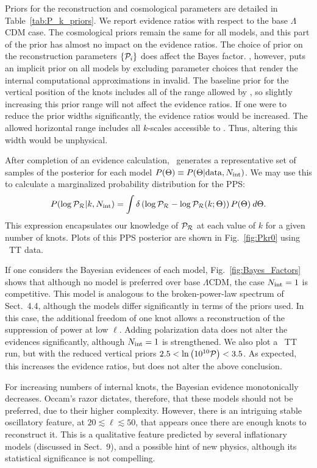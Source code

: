 Priors for the reconstruction and cosmological parameters are detailed in Table~\ref{tab:P_k_priors}.
We report evidence ratios with respect to the base $\Lambda$CDM case. The cosmological priors remain the
same for all models, and this part of the prior has almost no impact on the evidence ratios.
The choice of prior on the reconstruction parameters
$\{\mathcal{P}_{i}\}$ does affect the Bayes factor. \CosmoMC{}, however, puts an implicit prior on all models by excluding
parameter choices that render the internal computational approximations in \CAMB{} invalid.
The baseline prior for the vertical position of the knots includes all
of the range allowed by \CosmoMC{}, so slightly increasing this prior range will not affect the evidence ratios. If
one were to reduce the prior widths significantly, the evidence ratios would be increased.
The allowed horizontal range includes all $k$-scales accessible to \Planck. Thus, altering this
width would be unphysical.


After completion of an evidence calculation, \PolyChord\ generates a representative set of samples of the posterior for each model
$P(\Theta) \equiv P(\Theta|\mathrm{data},N_\mathrm{int})$. We may use this to calculate a marginalized probability distribution
for the PPS:
\begin{equation}
  P(\log\mathcal{P}_\mathcal{R}|k,N_\mathrm{int}) = \int \delta\left(\log\mathcal{P}_\mathcal{R} - \log\mathcal{P}_\mathcal{R}(k;\Theta)\right)P(\Theta)\:d\Theta.
  \label{eqn:margPR}
\end{equation}
This expression encapsulates our knowledge of $\mathcal{P}_\mathcal{R}$ at each value of $k$ for a given number of knots.
Plots of this PPS posterior are shown in Fig.~\ref{fig:Pkr0} using \Planck\ TT data.



If one considers the Bayesian evidences of each model, Fig.~\ref{fig:Bayes_Factors} shows that although no model is 
preferred over base $\Lambda$CDM, the case $N_\mathrm{int}=1$
is competitive. This model is analogous to the broken-power-law spectrum of
Sect.~4.4,
although the models differ significantly in terms of the priors used. In this case, the
additional freedom of one knot allows a reconstruction of the suppression of power at low $\ell$. Adding polarization data does not alter 
the evidences significantly, although $N_\mathrm{int}=1$ is strengthened. We also plot a \Planck\ TT run,
but with the reduced vertical priors ${2.5<\ln\left(10^{10}\mathcal{P}\right)<3.5}$. 
As expected, this increases the evidence ratios, but does not alter the above conclusion.

For increasing numbers of internal knots, the Bayesian evidence monotonically decreases. Occam's razor dictates,
therefore, that these models should not be preferred, due to their higher complexity. However, there is an
intriguing stable oscillatory feature, at $20\lesssim\ell\lesssim50$, that appears once there are enough knots to reconstruct it.
This is a qualitative feature predicted by several inflationary models (discussed in Sect.~9),
and a possible hint of new physics, although
its statistical significance is not compelling.


